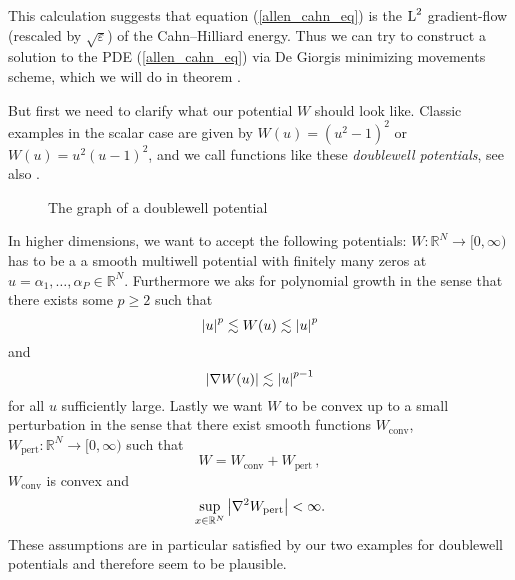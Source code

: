 This calculation suggests that equation (\ref{allen_cahn_eq}) is the $ \operatorname{L}^{ 2 } $ gradient-flow (rescaled by $ \sqrt{\varepsilon} $) of the Cahn--Hilliard energy. Thus we can try to construct a solution to the PDE (\ref{allen_cahn_eq}) via De Giorgis minimizing movements scheme, which we will do in theorem .

But first we need to clarify what our potential $ W $ should look like. Classic examples in the scalar case are given by $ W ( u ) = \left( u^{ 2 } - 1 \right)^{ 2 } $ or $ W( u ) = u^{ 2 } ( u - 1 )^{ 2 } $, and we call functions like these \emph{doublewell potentials}, see also .

\begin{figure}[ht]
\centering
{}
\caption{The graph of a doublewell potential}
\label{graph_of_doublewell_potential}
\end{figure}

In higher dimensions, we want to accept the following potentials: $ W \colon \mathbb{ R }^{ N } \to [0, \infty ) $ has to be a a smooth multiwell potential with finitely many zeros at $ u = \alpha_{ 1 }, \dotsc , \alpha_{ P } \in \mathbb{ R }^{ N } $. Furthermore we aks for polynomial growth in the sense that there exists some $ p \geq 2 $ such that
\begin{equation}
	\label{polynomial_growth}
	\abs{ u }^{ p } \lesssim W(u) \lesssim \abs{ u }^{ p }
\end{equation}
and
\begin{equation}
	\label{polynomial_growth_derivative}
	\abs{ \nabla W ( u ) } \lesssim \abs{ u }^{ p -1 }
\end{equation}
for all $ u $ sufficiently large. Lastly we want $ W $ to be convex up to a small perturbation in the sense that there exist smooth functions 
$ W_{ \mathrm{conv} }$, $ W_{ \mathrm{pert} } \colon \mathbb{ R }^{ N } \to [ 0 , \infty ) $ such that
\begin{equation}
	\label{decomposition_of_w}
	W = W_{ \mathrm{conv}} + W_{ \mathrm{pert}}\, ,
\end{equation}
$ W_{ \mathrm{conv} } $ is convex and
\begin{equation}
	\label{perturbation bound}
	\sup_{ x \in \mathbb{ R }^{ N } }
	\abs{ \nabla^{ 2 } W_{ \mathrm{pert} } } < \infty.
\end{equation}
These assumptions are in particular satisfied by our two examples for doublewell potentials and therefore seem to be plausible.

